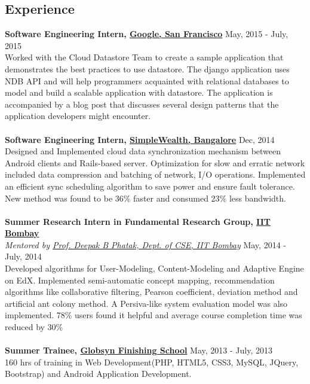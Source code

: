 \documentclass[margin, centered]{res}
\begin{document}
\begin{resume}
\section{Experience}
\textbf{Software Engineering Intern, \href{http://www.google.com}{Google, San Francisco}} \hfill May, 2015 - July, 2015\\
Worked with the Cloud Datastore Team to create a sample application that demonstrates the best practices to use datastore. The django application uses NDB API and will help programmers acquainted with relational databases to model and build a scalable application with datastore. The application is accompanied by a blog post that discusses several design patterns that the application developers might encounter. \\
\\
\textbf{Software Engineering Intern, \href{http://www.simplewealth.in/}{SimpleWealth, Bangalore}} \hfill Dec, 2014 \\
Designed and Implemented cloud data synchronization mechanism between Android clients and Rails-based server. Optimization for slow and erratic network included data compression and batching of network, I/O operations. Implemented an efficient sync scheduling algorithm to save power and ensure fault tolerance. New method was found to be 36\% faster and consumed 23\% less bandwidth. \\
\\
\textbf{Summer Research Intern in Fundamental Research Group, \href{http://www.cse.iitb.ac.in/}{IIT Bombay}} \\
\emph{Mentored by \href{http://en.wikipedia.org/wiki/Deepak_B._Phatak}{Prof. Deepak B Phatak, Dept. of CSE, IIT Bombay}} \hfill May, 2014 - July, 2014 \\
Developed algorithms for User-Modeling, Content-Modeling and Adaptive Engine on EdX. Implemented semi-automatic concept mapping, recommendation algorithms like collaborative filtering, Pearson coefficient, deviation method and artificial ant colony method. A Persiva-like system evaluation model was also implemented. 78\% users found it helpful and average course completion time was reduced by 30\%\\
\\
\textbf{Summer Trainee, \href{http://www.globsynskills.com/gfs/}{Globsyn Finishing School}} \hfill May, 2013 - July, 2013 \\
160 hrs of training in Web Development(PHP, HTML5, CSS3, MySQL, JQuery, Bootstrap) and Android Application Development.


\end{resume}
\end{document}

